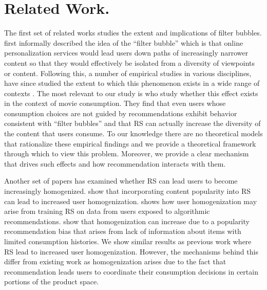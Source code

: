 \documentclass[manuscript, nonacm]{acmart}
\begin{document}
\section{Related Work.} 
\par
The first set of related works studies the extent and implications of filter bubbles. \cite{pariser2011filter} first informally described the idea of the ``filter bubble'' which is that online personalization services would lead users down paths of increasingly narrower content so that they would effectively be isolated from a diversity of viewpoints or content. Following this, a number of empirical studies in various disciplines, have since studied the extent to which this phenomenon exists in a wide range of contexts \cite{flaxman2016filter,hosanagar2013will,moller2018blame,nguyen2014exploring}. The most relevant to our study is \cite{nguyen2014exploring} who study whether this effect exists in the context of movie consumption. They find that even users whose consumption choices are not guided by recommendations exhibit behavior consistent with ``filter bubbles'' and that RS can actually increase the diversity of the content that users consume. To our knowledge there are no theoretical models that rationalize these empirical findings and we provide a theoretical framework through which to view this problem. Moreover, we provide a clear mechanism that drives such effects and how recommendation interacts with them.
\par 
Another set of papers has examined whether RS can lead users to become increasingly homogenized. \cite{celma2008hits, treviranus2009value} show that incorporating content popularity into RS can lead to increased user homogenization. \cite{chaney2018algorithmic} shows how user homogenization may arise from training RS on data from users exposed to algorithmic recommendations. \cite{fleder2009blockbuster} show that homogenization can increase due to a popularity recommendation bias that arises from lack of information about items with limited consumption histories. We show similar results as previous work where RS lead to increased user homogenization. However, the mechanisms behind this differ from existing work as homogenization arises due to the fact that recommendation leads users to coordinate their consumption decisions in certain portions of the product space.
\par
\end{document}

